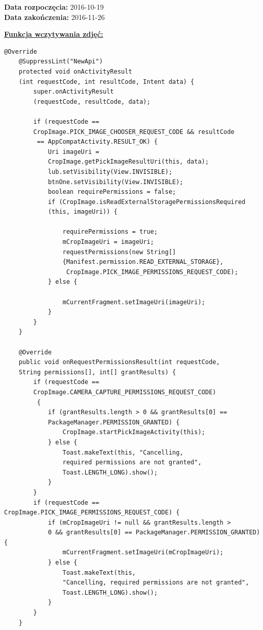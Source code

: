 \noindent\textbf{Data rozpoczęcia:} 2016-10-19\\

\noindent\textbf{Data zakończenia:} 2016-11-26\\

\begin{center}
\underline{\textbf{Funkcja wczytywania zdjęć:}}
\end{center}

\begin{verbatim}
@Override
    @SuppressLint("NewApi")
    protected void onActivityResult
    (int requestCode, int resultCode, Intent data) {
        super.onActivityResult
        (requestCode, resultCode, data);

        if (requestCode == 
        CropImage.PICK_IMAGE_CHOOSER_REQUEST_CODE && resultCode
         == AppCompatActivity.RESULT_OK) {
            Uri imageUri = 
            CropImage.getPickImageResultUri(this, data);
            lub.setVisibility(View.INVISIBLE);
            btnOne.setVisibility(View.INVISIBLE);
            boolean requirePermissions = false;
            if (CropImage.isReadExternalStoragePermissionsRequired
            (this, imageUri)) {

                requirePermissions = true;
                mCropImageUri = imageUri;
                requestPermissions(new String[]
                {Manifest.permission.READ_EXTERNAL_STORAGE},
                 CropImage.PICK_IMAGE_PERMISSIONS_REQUEST_CODE);
            } else {

                mCurrentFragment.setImageUri(imageUri);
            }
        }
    }

    @Override
    public void onRequestPermissionsResult(int requestCode, 
    String permissions[], int[] grantResults) {
        if (requestCode == 
        CropImage.CAMERA_CAPTURE_PERMISSIONS_REQUEST_CODE)
         {
            if (grantResults.length > 0 && grantResults[0] == 
            PackageManager.PERMISSION_GRANTED) {
                CropImage.startPickImageActivity(this);
            } else {
                Toast.makeText(this, "Cancelling, 
                required permissions are not granted", 
                Toast.LENGTH_LONG).show();
            }
        }
        if (requestCode == CropImage.PICK_IMAGE_PERMISSIONS_REQUEST_CODE) {
            if (mCropImageUri != null && grantResults.length > 
            0 && grantResults[0] == PackageManager.PERMISSION_GRANTED) {
                mCurrentFragment.setImageUri(mCropImageUri);
            } else {
                Toast.makeText(this, 
                "Cancelling, required permissions are not granted", 
                Toast.LENGTH_LONG).show();
            }
        }
    }
\end{verbatim}
